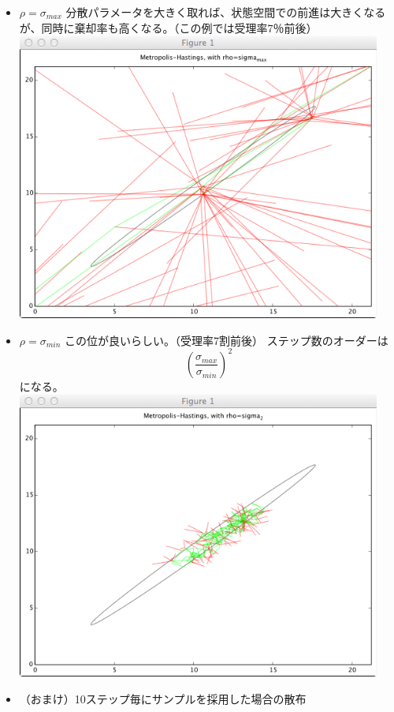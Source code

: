 \documentclass{jsarticle}
\begin{document}
\begin{itemize}
\item $\rho=\sigma_{max}$
分散パラメータを大きく取れば、状態空間での前進は大きくなるが、同時に棄却率も高くなる。（この例では受理率7％前後）\\
\includegraphics[width=12cm]{img/mh3.png}
\item $\rho=\sigma_{min}$
この位が良いらしい。（受理率7割前後）
ステップ数のオーダーは
\begin{equation}
(\frac{\sigma_{max}}{\sigma_{min}})^2
\end{equation}
になる。\\
\includegraphics[width=12cm]{img/mh2.png}
\item （おまけ）10ステップ毎にサンプルを採用した場合の散布\\

\end{itemize}
\end{document}
